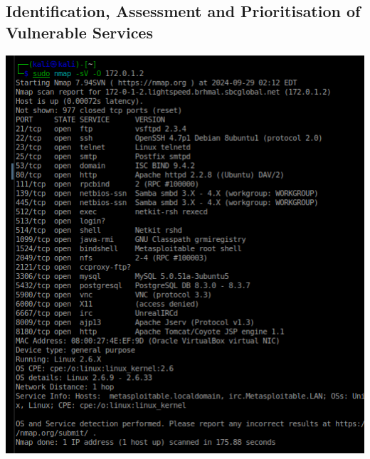 \documentclass[12pt,a4paper]{report}
\begin{document}
\subsection{Identification, Assessment and Prioritisation of Vulnerable Services}

\includegraphics[scale=1]{remmina_lab-71b59751-cf7c-46af-9c75-5b732ca5c73e.australiaeast.cloudapp.azure.com_7095_lab-71b59751-cf7c-46af-9c75-5b732ca5c73e.australiaeast.cloudapp.azure.com_7095_20240929-062627.png} 

\newpage
\end{document}
